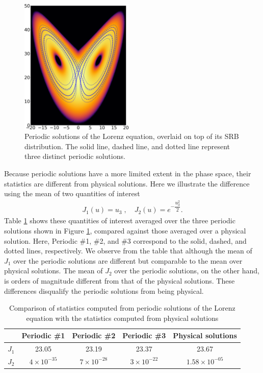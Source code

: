 \begin{figure}\centering
\includegraphics[width=0.48\textwidth]{figure/lorenz_periodic.png}
\caption{Periodic solutions of the Lorenz equation, overlaid on top of
its SRB distribution.  The solid line, dashed line, and dotted line
represent three distinct periodic solutions.}
\label{fig:lorenz_periodic}
\end{figure}

Because periodic solutions have a more limited extent in the phase space, their
statistics are different from physical solutions.
Here we illustrate the difference using the mean of two
quantities of interest
\begin{align}
    J_1(u) = u_3\;,\quad J_2(u) = e^{-\dfrac{u_3^2}2}.
\end{align}
Table \ref{tab:lorenz_periodic_stats} shows these quantities
of interest averaged over the three periodic solutions shown in Figure
\ref{fig:lorenz_periodic}, compared against those averaged over a
physical solution.  Here, Periodic \#1, \#2, and \#3 correspond to
the solid, dashed, and dotted lines, respectively.
We observe from the table that although the mean of $J_1$ over the periodic
solutions are different but comparable to the mean over physical solutions.  The mean of $J_2$ over the periodic solutions, on the other hand,
is orders of magnitude different from that of the physical solutions.
These differences disqualify the periodic solutions from being physical.
\begin{table}[H]
    \centering
    \begin{tabular}{c|c|c|c|c}
             & Periodic \#1 & Periodic \#2
             & Periodic \#3 & Physical solutions \\
    \hline
        $J_1$& 23.05 &
               23.19 &
               23.37 &
               23.67 \\
        $J_2$&$4\times 10^{-35}$&
              $7\times 10^{-28}$&
              $3\times 10^{-22}$&
              $1.58\times 10^{-05}$
    \end{tabular}
    \caption{Comparison of statistics computed from periodic solutions of the Lorenz equation with the statistics computed from physical solutions}
    \label{tab:lorenz_periodic_stats}
\end{table}

